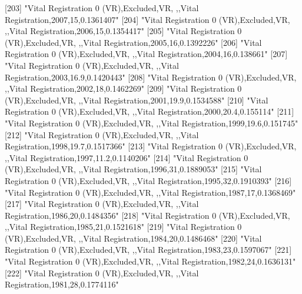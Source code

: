 [203] "Vital Registration 0 (VR),Excluded,VR, ,,Vital Registration,2007,15,0.1361407"                                                
[204] "Vital Registration 0 (VR),Excluded,VR, ,,Vital Registration,2006,15,0.1354417"                                                
[205] "Vital Registration 0 (VR),Excluded,VR, ,,Vital Registration,2005,16,0.1392226"                                                
[206] "Vital Registration 0 (VR),Excluded,VR, ,,Vital Registration,2004,16,0.138661"                                                 
[207] "Vital Registration 0 (VR),Excluded,VR, ,,Vital Registration,2003,16.9,0.1420443"                                              
[208] "Vital Registration 0 (VR),Excluded,VR, ,,Vital Registration,2002,18,0.1462269"                                                
[209] "Vital Registration 0 (VR),Excluded,VR, ,,Vital Registration,2001,19.9,0.1534588"                                              
[210] "Vital Registration 0 (VR),Excluded,VR, ,,Vital Registration,2000,20.4,0.155114"                                               
[211] "Vital Registration 0 (VR),Excluded,VR, ,,Vital Registration,1999,19.6,0.151745"                                               
[212] "Vital Registration 0 (VR),Excluded,VR, ,,Vital Registration,1998,19.7,0.1517366"                                              
[213] "Vital Registration 0 (VR),Excluded,VR, ,,Vital Registration,1997,11.2,0.1140206"                                              
[214] "Vital Registration 0 (VR),Excluded,VR, ,,Vital Registration,1996,31,0.1889053"                                                
[215] "Vital Registration 0 (VR),Excluded,VR, ,,Vital Registration,1995,32,0.1910393"                                                
[216] "Vital Registration 0 (VR),Excluded,VR, ,,Vital Registration,1987,17,0.1368469"                                                
[217] "Vital Registration 0 (VR),Excluded,VR, ,,Vital Registration,1986,20,0.1484356"                                                
[218] "Vital Registration 0 (VR),Excluded,VR, ,,Vital Registration,1985,21,0.1521618"                                                
[219] "Vital Registration 0 (VR),Excluded,VR, ,,Vital Registration,1984,20,0.1486468"                                                
[220] "Vital Registration 0 (VR),Excluded,VR, ,,Vital Registration,1983,23,0.1597067"                                                
[221] "Vital Registration 0 (VR),Excluded,VR, ,,Vital Registration,1982,24,0.1636131"                                                
[222] "Vital Registration 0 (VR),Excluded,VR, ,,Vital Registration,1981,28,0.1774116"                                                
